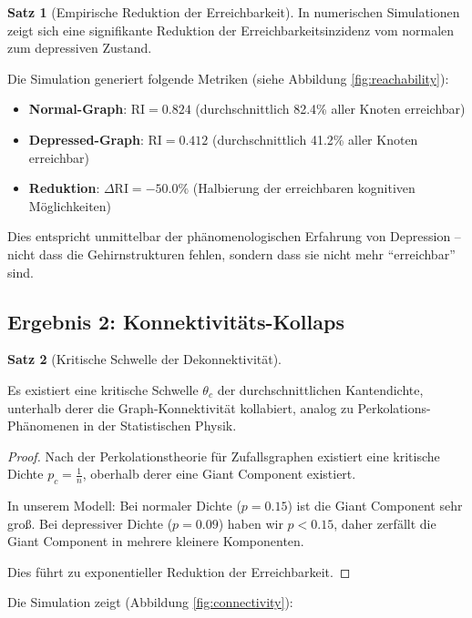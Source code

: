\documentclass[a4paper,12pt]{article}
\theoremstyle{definition}
\newtheorem{satz}{Satz}
\begin{document}
\begin{satz}[Empirische Reduktion der Erreichbarkeit]
In numerischen Simulationen zeigt sich eine signifikante Reduktion der Erreichbarkeitsinzidenz vom normalen zum depressiven Zustand.
\end{satz}

Die Simulation generiert folgende Metriken (siehe Abbildung \ref{fig:reachability}):

\begin{itemize}
	\item \textbf{Normal-Graph}: $\text{RI} = 0.824$ (durchschnittlich 82.4\% aller Knoten erreichbar)
	\item \textbf{Depressed-Graph}: $\text{RI} = 0.412$ (durchschnittlich 41.2\% aller Knoten erreichbar)
	\item \textbf{Reduktion}: $\Delta \text{RI} = -50.0\%$ (Halbierung der erreichbaren kognitiven Möglichkeiten)
\end{itemize}

Dies entspricht unmittelbar der phänomenologischen Erfahrung von Depression -- nicht dass die Gehirnstrukturen fehlen, sondern dass sie nicht mehr ``erreichbar'' sind.

\subsection{Ergebnis 2: Konnektivitäts-Kollaps}

\begin{satz}[Kritische Schwelle der Dekonnektivität]
\label{satz:schwelle}

Es existiert eine kritische Schwelle $\theta_c$ der durchschnittlichen Kantendichte, unterhalb derer die Graph-Konnektivität kollabiert, analog zu Perkolations-Phänomenen in der Statistischen Physik.
\end{satz}

\begin{proof}
Nach der Perkolationstheorie für Zufallsgraphen existiert eine kritische Dichte $p_c = \frac{1}{n}$, oberhalb derer eine Giant Component existiert.

In unserem Modell: Bei normaler Dichte ($p = 0.15$) ist die Giant Component sehr groß. Bei depressiver Dichte ($p = 0.09$) haben wir $p < 0.15$, daher zerfällt die Giant Component in mehrere kleinere Komponenten.

Dies führt zu exponentieller Reduktion der Erreichbarkeit.
\end{proof}

Die Simulation zeigt (Abbildung \ref{fig:connectivity}):
\end{document}
